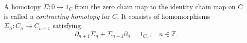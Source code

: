 A homotopy $\Sigma : 0 \to 1_C$ from the zero chain map to the identity chain map on $C$ is called a \textit{contracting homotopy} for $C$. It consists of homomorphisms $\Sigma_n : C_n \to C_{n+1}$ satisfying
$$\partial_{n+1} \Sigma_n + \Sigma_{n-1} \partial_n = 1_{C_n}, \quad n \in \mathbb{Z}.$$